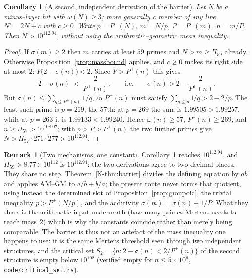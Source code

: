 \documentclass[11pt]{article}
\newtheorem{corollary}[theorem]{Corollary}
\theoremstyle{definition}
\newtheorem{remark}[theorem]{Remark}
\begin{document}
\begin{corollary}[A second, independent derivation of the barrier]\label{cor:secondbarrier}
Let $N$ be a minus--layer hit with $\omega(N)\ge3$; more generally a member of any line
$N'=2N+c$ with $c\ge0$. Write $p=P^+(N)$, $m=N/p$, $P=P^+(m)$, $n=m/P$. Then
$N>10^{112.94}$, without using the arithmetic--geometric mean inequality.
\end{corollary}
\begin{proof}
If $\sigma(m)\ge2$ then $m$ carries at least $59$ primes and $N>m\ge\Pi_{59}$ already. Otherwise
Proposition~\ref{prop:massbound} applies, and $c\ge0$ makes its right side at most $2$:
$P\bigl(2-\sigma(n)\bigr)<2$. Since $P>P^+(n)$ this gives
\[ 2-\sigma(n)\;<\;\frac2{P^+(n)},\qquad\text{i.e.}\qquad \sigma(n)>2-\frac2{P^+(n)}. \]
But $\sigma(n)\le\sum_{q\le P^+(n)}1/q$, so $P^+(n)$ must satisfy
$\sum_{q\le p}1/q>2-2/p$. The least such prime is $p=269$, the $57$th: at $p=269$ the sum is
$1.99505>1.99257$, while at $p=263$ it is $1.99133<1.99240$. Hence $\omega(n)\ge57$,
$P^+(n)\ge269$, and $n\ge\Pi_{57}>10^{108.07}$; with $p>P>P^+(n)$ the two further primes give
$N>\Pi_{57}\cdot271\cdot277>10^{112.94}$.
\end{proof}

\begin{remark}[Two mechanisms, one constant]\label{rem:twomechanisms}
Corollary~\ref{cor:secondbarrier} reaches $10^{112.94}$, and $\Pi_{59}>8.77\times10^{112}$ is
$10^{112.94}$: the two derivations agree to two decimal places. They share no step.
Theorem~\ref{K-thm:barrier} divides the defining equation by $ab$ and applies AM--GM to
$a/b+b/a$; the present route never forms that quotient, using instead the determined slot of
Proposition~\ref{prop:groupoid}, the trivial inequality $p>P^+(N/p)$, and the additivity
$\sigma(m)=\sigma(n)+1/P$. What they share is the arithmetic input underneath (how many primes
Mertens needs to reach mass~$2$) which is why the constants coincide rather than merely being
comparable. The barrier is thus not an artefact of the mass inequality one happens to use: it is
the same Mertens threshold seen through two independent structures, and the critical set
$S_2=\{n:2-\sigma(n)<2/P^+(n)\}$ of the second structure is empty below $10^{108}$ (verified empty
for $n\le5\times10^6$, \texttt{code/critical\_set.rs}).
\end{remark}
\end{document}
